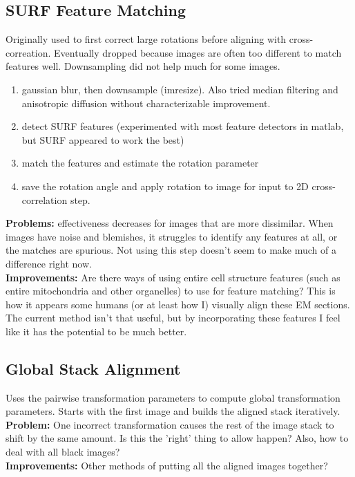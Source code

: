 \documentclass{article}
\begin{document}
\subsection{SURF Feature Matching}
Originally used to first correct large rotations before aligning with cross-correation. Eventually dropped because images are often too different to match features well. Downsampling did not help much for some images.\\
\begin{enumerate}
\item gaussian blur, then downsample (imresize). Also tried median filtering and anisotropic diffusion without characterizable improvement.
\item detect SURF features (experimented with most feature detectors in matlab, but SURF appeared to work the best)
\item match the features and estimate the rotation parameter
\item save the rotation angle and apply rotation to image for input to 2D cross-correlation step.
\end{enumerate}
\textbf{Problems:} effectiveness decreases for images that are more dissimilar. When images have noise and blemishes, it struggles to identify any features at all, or the matches are spurious. Not using this step doesn't seem to make much of a difference right now. \\
\textbf{Improvements:} Are there ways of using entire cell structure features (such as entire mitochondria and other organelles) to use for feature matching? This is how it appears some humans (or at least how I) visually align these EM sections. The current method isn't that useful, but by incorporating these features I feel like it has the potential to be much better.



\subsection{Global Stack Alignment}
Uses the pairwise transformation parameters to compute global transformation parameters. Starts with the first image and builds the aligned stack iteratively. \\
\textbf{Problem:} One incorrect transformation causes the rest of the image stack to shift by the same amount. Is this the 'right' thing to allow happen? Also, how to deal with all black images? \\
\textbf{Improvements:} Other methods of putting all the aligned images together?
\end{document}
